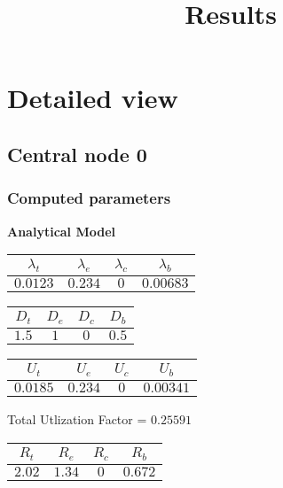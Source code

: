 \documentclass{article}
\title{Results}
\begin{document}
\section{Detailed view}
\subsection{Central node 0}
\subsubsection{Computed parameters}
\begin{minipage}{0.5\textwidth}
\centering	\textbf{Analytical Model}
\begin{table}[H]
\centering
\begin{tabular}{@{}cccc@{}}
\toprule
$\lambda_t$ & $\lambda_e$ & $\lambda_c$ & $\lambda_b$\\
\midrule
$0.0123$ & $0.234$ & $0$ & $0.00683$\\
\bottomrule
\end{tabular}
\end{table}\begin{table}[H]
\centering
\begin{tabular}{@{}cccc@{}}
\toprule
$D_t$ & $D_e$ & $D_c$ & $D_b$\\
\midrule
$1.5$ & $1$ & $0$ & $0.5$\\
\bottomrule
\end{tabular}
\end{table}\begin{table}[H]
\centering
\begin{tabular}{@{}cccc@{}}
\toprule
$U_t$ & $U_e$ & $U_c$ & $U_b$\\
\midrule
$0.0185$ & $0.234$ & $0$ & $0.00341$\\
\bottomrule
\end{tabular}
\end{table}
\centering Total Utlization Factor = $0.25591$
\begin{table}[H]
\centering
\begin{tabular}{@{}cccc@{}}
\toprule
$R_t$ & $R_e$ & $R_c$ & $R_b$\\
\midrule
$2.02$ & $1.34$ & $0$ & $0.672$\\
\bottomrule
\end{tabular}
\end{table}
\end{minipage}
\end{document}
